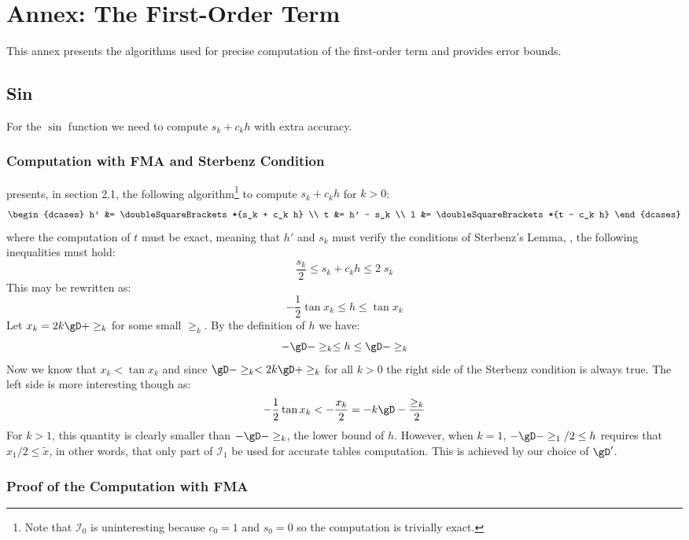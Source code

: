 \documentclass[10pt, a4paper, twoside]{basestyle}
\newcommand{\round}[1]{\doubleSquareBrackets*{#1}}
\newcommand{\red}[1]{\tilde{#1}}
\begin{document}
\section*{Annex: The First-Order Term}\label{firstorder}

This annex presents the algorithms used for precise computation of the first-order term and provides error bounds.

\subsection*{Sin}

For the $\sin$ function we need to compute $s_k + c_k h$ with extra accuracy.

\subsubsection*{Computation with FMA and Sterbenz Condition}\label{fmasin}

\cite{StehléZimmermann2005} presents, in section 2.1, the following algorithm\footnote{Note that $\mathscr{I}_0$ is uninteresting because $c_0 = 1$ and $s_0 = 0$ so the computation is trivially exact.} to compute $s_k + c_k h$ for $k > 0$:
\[
\begin{dcases}
h' &= \round{s_k + c_k h} \\
t &= h' - s_k \\
l &= \round{t - c_k h}
\end{dcases}
\]
where the computation of $t$ must be exact, meaning that $h'$ and $s_k$ must verify the conditions of Sterbenz's Lemma, \idest, the following inequalities must hold:
\[
\frac{s_k}{2} \le s_k + c_k h \le 2 \; s_k
\]
This may be rewritten as:
\[
-\frac{1}{2} \tan x_k \le h \le \tan x_k
\]
Let $x_k = 2 k \gD + \ge_k$ for some small $\ge_k$.  By the definition of $h$ we have:
\[
-\gD - \ge_k \le h \le \gD - \ge_k
\]
Now we know that $x_k < \tan x_k$ and since $\gD - \ge_k < 2 k \gD + \ge_k$ for all $k > 0$ the right side of the Sterbenz condition is always true.  The left side is more interesting though as:
\[
-\frac{1}{2} \tan x_k < -\frac{x_k}{2} = -k \gD - \frac{\ge_k}{2}
\]
For $k > 1$, this quantity is clearly smaller than $-\gD - \ge_k$, the lower bound of $h$.  However, when $k = 1$, $-\gD - \ge_1 / 2 \le h$ requires that $x_1 / 2 \le \red x$, in other words, that only part of $\mathscr{I}_1$ be used for accurate tables computation.  This is achieved by our choice of $\gD'$.

\subsubsection*{Proof of the Computation with FMA}\label{prooffmasin}
\end{document}
